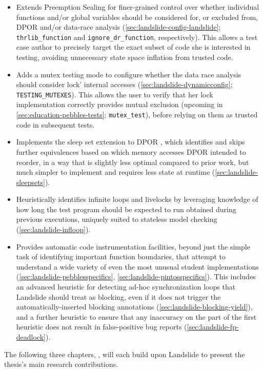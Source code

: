 {\begin{itemize}
	\item Extends Preemption Sealing for finer-grained control
		over whether individual functions and/or global variables
		should be considered for, or excluded from,
		DPOR and/or data-race analysis
		(\cref{sec:landslide-config-landslide};
		{\tt thrlib\_function} and {\tt ignore\_dr\_function}, respectively).
		This allows a test case author to precisely target the exact subset of code
		she is interested in testing,
		avoiding unnecessary state space inflation from trusted code.
	\item Adds a mutex testing mode to configure whether the
		data race analysis should consider lock' internal accesses
		(\cref{sec:landslide-dynamicconfig}; {\tt TESTING\_MUTEXES}).
		This allows the user to verify that her lock implementation
		correctly provides mutual exclusion
		(upcoming in \cref{sec:education-pebbles-tests}; {\tt mutex\_test}),
		before relying on them as trusted code in subsequent tests.
	\item Implements the sleep set extension to DPOR \cite{partial-order-methods,dpor,optimal-dpor},
		which identifies and skips further equivalences based on which memory accesses
		DPOR intended to reorder,
		in a way that is slightly less optimal compared to prior work,
		but much simpler to implement
		and requires less state at runtime (\cref{sec:landslide-sleepsets}).
	\item Heuristically identifies infinite loops and livelocks
		by leveraging knowledge of how long the test program should be expected to run
		obtained during previous executions,
		uniquely suited to stateless model checking (\cref{sec:landslide-infloop}).
	\item Provides automatic code instrumentation facilities,
		beyond just the simple task of identifying important function boundaries,
		that attempt to understand a wide variety of even the most unusual student implementations
		(\cref{sec:landslide-pebblesspecifics},
		\cref{sec:landslide-pintosspecifics}).
		This includes an advanced heuristic for detecting ad-hoc synchronization loops
		that Landslide should treat as blocking, %
		even if it does not trigger the automatically-inserted blocking annotations
		(\cref{sec:landslide-blocking-yield}),
		and a further heuristic to ensure that any inaccuracy on the part of the first heuristic
		does not result in false-positive bug reports (\cref{sec:landslide-fp-deadlock}).
\end{itemize}

The following three chapters, ,
will each build upon Landslide to present the thesis's main research contributions.}
